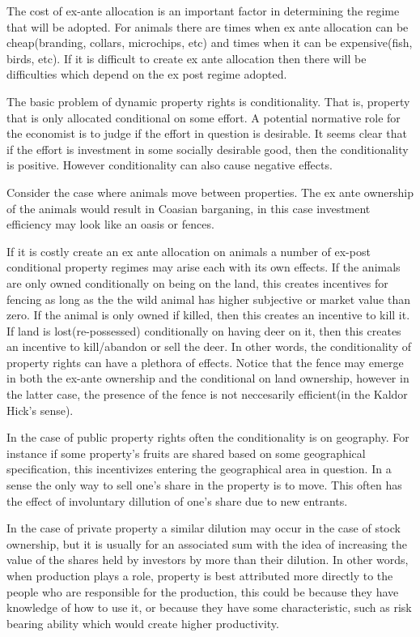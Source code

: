 \documentclass[12pt]{article}
\numberwithin{equation}{section}
\begin{document}
The cost of ex-ante allocation is an important factor in determining the regime that will be adopted. For animals there are times when ex ante allocation can be cheap(branding, collars, microchips, etc) and times when it can be expensive(fish, birds, etc). If it is difficult to create ex ante allocation then there will be difficulties which depend on the ex post regime adopted. 

The basic problem of dynamic property rights is conditionality. That is, property that is only allocated conditional on some effort. A potential normative role for the economist is to judge if the effort in question is desirable. It seems clear that if the effort is investment in some socially desirable good, then the conditionality is positive. However conditionality can also cause negative effects. 

Consider the case where animals move between properties. The ex ante ownership of the animals would result in Coasian barganing, in this case investment efficiency may look like an oasis or fences.

If it is costly create an ex ante allocation on animals a number of ex-post conditional property regimes may arise each with its own effects. If the animals are only owned conditionally on being on the land, this creates incentives for fencing as long as the the wild animal has higher subjective or market value than zero. If the animal is only owned if killed, then this creates an incentive to kill it. If land is lost(re-possessed) conditionally on having deer on it, then this creates an incentive to kill/abandon or sell the deer. In other words, the conditionality of property rights can have a plethora of effects. Notice that the fence may emerge in both the ex-ante ownership and the conditional on land ownership, however in the latter case, the presence of the fence is not neccesarily efficient(in the Kaldor Hick's sense). 

In the case of public property rights often the conditionality is on geography. For instance if some property's fruits are shared based on some geographical specification, this incentivizes entering the geographical area in question. In a sense the only way to sell one's share in the property is to move. This often has the effect of involuntary dillution of one's share due to new entrants.

In the case of private property a similar dilution may occur in the case of stock ownership, but it is usually for an associated sum with the idea of increasing the value of the shares held by investors by more than their dilution. In other words, when production plays a role, property is best attributed more directly to the people who are responsible for the production, this could be because they have knowledge of how to use it, or because they have some characteristic, such as risk bearing ability which would create higher productivity.  
\end{document}
